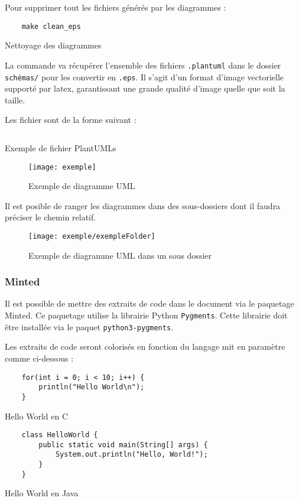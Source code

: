 Pour supprimer tout les fichiers générés par les diagrammes :
\begin{code}
    \begin{verbatim}
    make clean_eps
\end{verbatim}
    \caption{Nettoyage des diagrammes}
\end{code}

La commande va récupérer l'ensemble des fichiers \verb=.plantuml=
dans le dossier \verb=schémas/= pour les convertir en \verb=.eps=.
Il s'agit d'un format d'image vectorielle supporté par \gls{latex},
garantissant une grande qualité d'image quelle que soit la taille.

Les fichier sont de la forme suivant :
\begin{code}
    \inputminted{vim}{../schemas/exemple.plantuml}
    \caption{Exemple de fichier PlantUMLs}
\end{code}

\begin{figure}[H]
    \centering
    \texttt{[image: exemple]}
    \caption{Exemple de diagramme UML}
\end{figure}

Il est posible de ranger les diagrammes dans des sous-dossiers dont il faudra préciser le chemin relatif.
\begin{figure}[H]
    \centering
    \texttt{[image: exemple/exempleFolder]}
    \caption{Exemple de diagramme UML dans un sous dossier }
\end{figure}

\subsubsection{Minted}
Il est possible de mettre des extraits de code dans le document via le paquetage Minted.
Ce paquetage utilise la librairie Python \verb=Pygments=.
Cette librairie doit être installée via le paquet \verb=python3-pygments=.

Les extraits de code seront colorisés en fonction du langage mit en paramètre comme ci-dessous :

\begin{code}
    \begin{verbatim}
    for(int i = 0; i < 10; i++) {
        println("Hello World\n");
    }
\end{verbatim}
    \caption{Hello World en C}
\end{code}

\begin{code}
    \begin{verbatim}
    class HelloWorld {
        public static void main(String[] args) {
            System.out.println("Hello, World!");
        }
    }
\end{verbatim}
    \caption{Hello World en Java}
\end{code}

